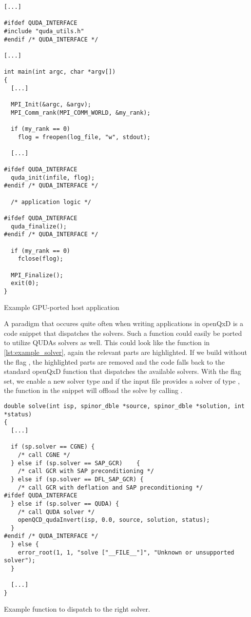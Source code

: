 \begin{codelisting}
\begin{verbatim}
[...]

#ifdef QUDA_INTERFACE
#include "quda_utils.h"
#endif /* QUDA_INTERFACE */

[...]

int main(int argc, char *argv[])
{
  [...]

  MPI_Init(&argc, &argv);
  MPI_Comm_rank(MPI_COMM_WORLD, &my_rank);

  if (my_rank == 0)
    flog = freopen(log_file, "w", stdout);

  [...]

#ifdef QUDA_INTERFACE
  quda_init(infile, flog);
#endif /* QUDA_INTERFACE */

  /* application logic */

#ifdef QUDA_INTERFACE
  quda_finalize();
#endif /* QUDA_INTERFACE */

  if (my_rank == 0)
    fclose(flog);

  MPI_Finalize();
  exit(0);
}
\end{verbatim}
\caption{Example GPU-ported host application}
\label{lst:example_program}
\end{codelisting}

A paradigm that occures quite often when writing applications in openQxD is a code snippet that dispatches the solvers. Such a function could easily be ported to utilize QUDAs solvers as well. This could look like the function  in \cref{lst:example_solver}, again the relevant parts are highlighted. If we build without the flag , the highlighted parts are removed and the code falls back to the standard openQxD function that dispatches the available solvers. With the flag set, we enable a new solver type  and if the input file provides a solver of type , the function in the snippet will offload the solve by calling .

\begin{codelisting}
\begin{verbatim}
double solve(int isp, spinor_dble *source, spinor_dble *solution, int *status)
{
  [...]

  if (sp.solver == CGNE) {
    /* call CGNE */
  } else if (sp.solver == SAP_GCR)    {
    /* call GCR with SAP preconditioning */
  } else if (sp.solver == DFL_SAP_GCR) {
    /* call GCR with deflation and SAP preconditioning */
#ifdef QUDA_INTERFACE
  } else if (sp.solver == QUDA) {
    /* call QUDA solver */
    openQCD_qudaInvert(isp, 0.0, source, solution, status);
  }
#endif /* QUDA_INTERFACE */
  } else {
    error_root(1, 1, "solve ["__FILE__"]", "Unknown or unsupported solver");
  }

  [...]
}
\end{verbatim}
\caption{Example function to dispatch to the right solver.}
\label{lst:example_solver}
\end{codelisting}

